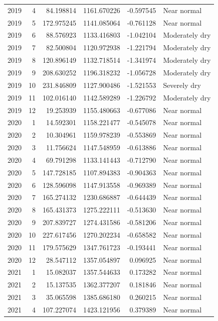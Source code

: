 \begin{tabular}{rrrrrl}
2019 & 4 & 84.198814 & 1161.670226 & -0.597545 & Near normal \\
2019 & 5 & 172.975245 & 1141.085064 & -0.761128 & Near normal \\
2019 & 6 & 88.576923 & 1133.416803 & -1.042104 & Moderately dry \\
2019 & 7 & 82.500804 & 1120.972938 & -1.221794 & Moderately dry \\
2019 & 8 & 120.896149 & 1132.718514 & -1.341974 & Moderately dry \\
2019 & 9 & 208.630252 & 1196.318232 & -1.056728 & Moderately dry \\
2019 & 10 & 231.846809 & 1127.900486 & -1.521553 & Severely dry \\
2019 & 11 & 102.016140 & 1142.589289 & -1.226792 & Moderately dry \\
2019 & 12 & 19.253939 & 1155.480663 & -0.677086 & Near normal \\
2020 & 1 & 14.592301 & 1158.221477 & -0.545078 & Near normal \\
2020 & 2 & 10.304961 & 1159.978239 & -0.553869 & Near normal \\
2020 & 3 & 11.756624 & 1147.548959 & -0.613886 & Near normal \\
2020 & 4 & 69.791298 & 1133.141443 & -0.712790 & Near normal \\
2020 & 5 & 147.728185 & 1107.894383 & -0.904363 & Near normal \\
2020 & 6 & 128.596098 & 1147.913558 & -0.969389 & Near normal \\
2020 & 7 & 165.274132 & 1230.686887 & -0.644439 & Near normal \\
2020 & 8 & 165.431373 & 1275.222111 & -0.513630 & Near normal \\
2020 & 9 & 207.839727 & 1274.431586 & -0.581206 & Near normal \\
2020 & 10 & 227.617456 & 1270.202234 & -0.658582 & Near normal \\
2020 & 11 & 179.575629 & 1347.761723 & -0.193441 & Near normal \\
2020 & 12 & 28.547112 & 1357.054897 & 0.096925 & Near normal \\
2021 & 1 & 15.082037 & 1357.544633 & 0.173282 & Near normal \\
2021 & 2 & 15.137535 & 1362.377207 & 0.181846 & Near normal \\
2021 & 3 & 35.065598 & 1385.686180 & 0.260215 & Near normal \\
2021 & 4 & 107.227074 & 1423.121956 & 0.379389 & Near normal \\

\end{tabular}

